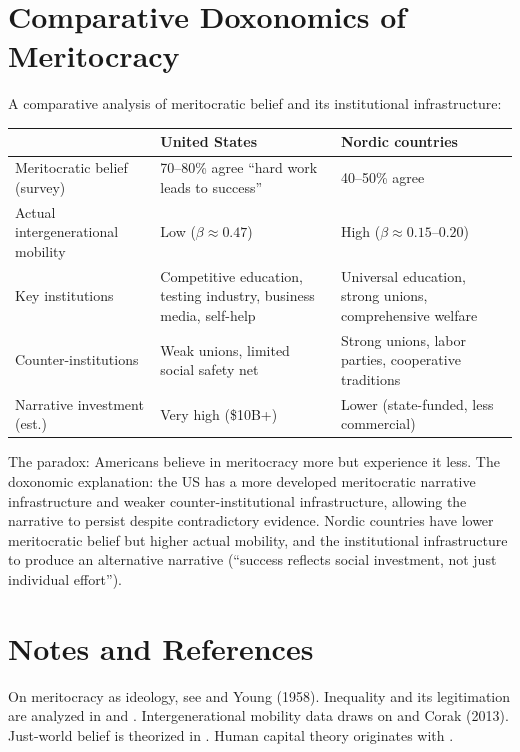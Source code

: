 \section{Comparative Doxonomics of Meritocracy}
\label{sec:ch22-comparative}

\begin{example}
\label{ex:us-nordic-comparison}
A comparative analysis of meritocratic belief and its institutional infrastructure:

\begin{center}
\begin{tabular}{p{3.5cm}p{4.5cm}p{4.5cm}}
\toprule
& United States & Nordic countries \\
\midrule
Meritocratic belief (survey) & 70--80\% agree ``hard work leads to success'' & 40--50\% agree \\[4pt]
Actual intergenerational mobility & Low ($\beta \approx 0.47$) & High ($\beta \approx 0.15$--$0.20$) \\[4pt]
Key institutions & Competitive education, testing industry, business media, self-help & Universal education, strong unions, comprehensive welfare \\[4pt]
Counter-institutions & Weak unions, limited social safety net & Strong unions, labor parties, cooperative traditions \\[4pt]
Narrative investment (est.) & Very high (\$10B+) & Lower (state-funded, less commercial) \\
\bottomrule
\end{tabular}
\end{center}

The paradox: Americans believe in meritocracy more but experience it less.
The doxonomic explanation: the US has a more developed meritocratic narrative infrastructure and weaker counter-institutional infrastructure, allowing the narrative to persist despite contradictory evidence.
Nordic countries have lower meritocratic belief but higher actual mobility, and the institutional infrastructure to produce an alternative narrative (``success reflects social investment, not just individual effort'').
\end{example}

\section{Notes and References}
\label{sec:ch22-notes}

On meritocracy as ideology, see \textcite{sandel2012} and Young (1958).
Inequality and its legitimation are analyzed in \textcite{piketty2014} and \textcite{stiglitz2012}.
Intergenerational mobility data draws on \textcite{chetty2014} and Corak (2013).
Just-world belief is theorized in \textcite{lerner1980}.
Human capital theory originates with \textcite{becker1964}.

